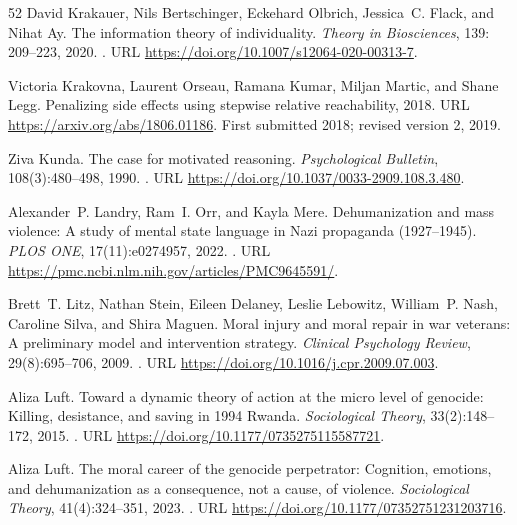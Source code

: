 \documentclass[11pt,a4paper]{article}
\theoremstyle{remark}
\begin{document}
\begin{thebibliography}{52}
David Krakauer, Nils Bertschinger, Eckehard Olbrich, Jessica~C. Flack, and
  Nihat Ay.
\newblock The information theory of individuality.
\newblock \emph{Theory in Biosciences}, 139: 209--223, 2020.
\newblock {}.
\newblock URL \url{https://doi.org/10.1007/s12064-020-00313-7}.

Victoria Krakovna, Laurent Orseau, Ramana Kumar, Miljan Martic, and Shane Legg.
\newblock Penalizing side effects using stepwise relative reachability, 2018.
\newblock URL \url{https://arxiv.org/abs/1806.01186}.
\newblock First submitted 2018; revised version 2, 2019.

Ziva Kunda.
\newblock The case for motivated reasoning.
\newblock \emph{Psychological Bulletin}, 108(3):480--498, 1990.
\newblock {}.
\newblock URL \url{https://doi.org/10.1037/0033-2909.108.3.480}.

Alexander~P. Landry, Ram~I. Orr, and Kayla Mere.
\newblock Dehumanization and mass violence: A study of mental state language
in Nazi propaganda (1927--1945).
\newblock \emph{PLOS ONE}, 17(11):e0274957, 2022.
\newblock {}.
\newblock URL \url{https://pmc.ncbi.nlm.nih.gov/articles/PMC9645591/}.

Brett~T. Litz, Nathan Stein, Eileen Delaney, Leslie Lebowitz, William~P. Nash,
Caroline Silva, and Shira Maguen.
\newblock Moral injury and moral repair in war veterans: A preliminary model
and intervention strategy.
\newblock \emph{Clinical Psychology Review}, 29(8):695--706, 2009.
\newblock {}.
\newblock URL \url{https://doi.org/10.1016/j.cpr.2009.07.003}.

Aliza Luft.
\newblock Toward a dynamic theory of action at the micro level of genocide:
Killing, desistance, and saving in 1994 Rwanda.
\newblock \emph{Sociological Theory}, 33(2):148--172, 2015.
\newblock {}.
\newblock URL \url{https://doi.org/10.1177/0735275115587721}.

Aliza Luft.
\newblock The moral career of the genocide perpetrator: Cognition, emotions,
and dehumanization as a consequence, not a cause, of violence.
\newblock \emph{Sociological Theory}, 41(4):324--351, 2023.
\newblock {}.
\newblock URL \url{https://doi.org/10.1177/07352751231203716}.


\end{thebibliography}
\end{document}
